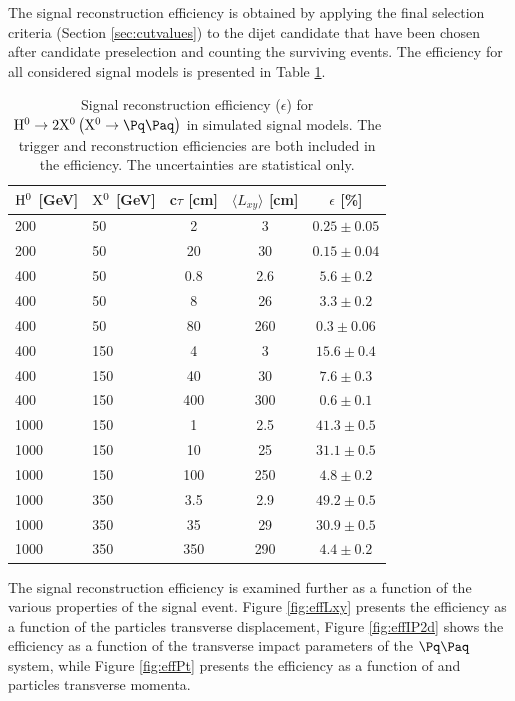 The signal reconstruction efficiency is obtained by applying the final selection
criteria (Section \ref{sec:cutvalues}) to the dijet candidate that have been chosen 
after candidate preselection and counting the surviving events.
The efficiency for all considered signal models 
is presented in Table 
\ref{tab:sigeff}. 

\begin{table}[htbp]
\caption{
Signal reconstruction efficiency ($\epsilon$) for $\Higgs \to 2\X \left(\X \to \qq\right)$ 
in simulated signal models.
The trigger and reconstruction efficiencies are both included in the efficiency.
The uncertainties are statistical only.\label{tab:sigeff}}
\centering
\begin{tabular}{llccc}
\hline
$\mathrm{H}^{0}$ [GeV] & $\mathrm{X^{0}}$ [GeV] & c$\tau$ [cm] & $\langle L_{xy} \rangle$ [cm] & $\epsilon$ [\%] \\
\hline
200 & 50 & 2 & 3 & $0.25 \pm 0.05$ \\
200 & 50 & 20 & 30 & $0.15 \pm 0.04$ \\
\hline
400 & 50 & 0.8 & 2.6 & $5.6 \pm 0.2$ \\
400 & 50 & 8 & 26 &  $3.3 \pm 0.2$ \\
400 & 50 & 80 & 260 & $0.3 \pm 0.06$ \\
\hline
400 & 150 & 4 & 3 & $15.6 \pm 0.4$ \\
400 & 150 & 40 & 30 & $7.6 \pm 0.3$ \\
400 & 150 & 400 & 300 & $0.6 \pm 0.1$ \\
\hline
1000 & 150 & 1 & 2.5 & $41.3 \pm 0.5$ \\
1000 & 150 & 10 & 25 & $31.1 \pm 0.5$ \\
1000 & 150 & 100 & 250 & $4.8 \pm 0.2$ \\
\hline
1000 & 350 & 3.5 & 2.9 & $49.2 \pm 0.5$ \\
1000 & 350 & 35 & 29 & $30.9 \pm 0.5$ \\
1000 & 350 & 350 & 290 & $4.4 \pm 0.2$ \\
\hline

\end{tabular}
\end{table}

The signal reconstruction efficiency is examined further as a function of the various
properties of the signal event. 
Figure \ref{fig:effLxy} presents the efficiency as a function of the \X particles
transverse displacement, Figure \ref{fig:effIP2d} shows the efficiency as a function of
the transverse impact parameters of the $\qq$ system, while Figure \ref{fig:effPt} presents
the efficiency as a function of \Higgs and \X particles transverse momenta.

